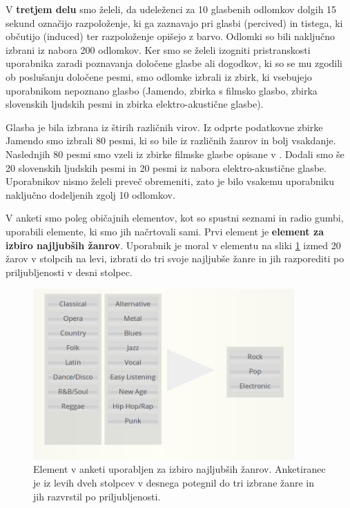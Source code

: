 \documentclass[a4paper, 12pt]{book}
\begin{document}
{V \textbf{tretjem delu} smo želeli, da udeleženci za 10 glasbenih odlomkov dolgih 15 sekund označijo razpoloženje, ki ga zaznavajo pri glasbi (percived) in tistega, ki občutijo (induced) ter razpoloženje opišejo z barvo. Odlomki so bili naključno izbrani iz nabora 200 odlomkov. Ker smo se želeli izogniti pristranskosti uporabnika zaradi poznavanja določene glasbe ali dogodkov, ki so se mu zgodili ob poslušanju določene pesmi, smo odlomke izbrali iz zbirk, ki vsebujejo uporabnikom nepoznano glasbo (Jamendo, zbirka s filmsko glasbo, zbirka slovenskih ljudskih pesmi in zbirka elektro-akustične glasbe).  

Glasba je bila izbrana iz štirih različnih virov. Iz odprte podatkovne zbirke Jamendo smo izbrali 80 pesmi, ki so bile iz različnih žanrov in bolj vsakdanje. Naslednjih 80 pesmi smo vzeli iz zbirke filmske glasbe opisane v \cite{Eerola2010}. Dodali smo še 20 slovenskih ljudskih pesmi in 20 pesmi iz nabora elektro-akustične glasbe. Uporabnikov nismo želeli preveč obremeniti, zato je bilo vsakemu uporabniku naključno dodeljenih zgolj 10 odlomkov.

V anketi smo poleg običajnih elementov, kot so spustni seznami in radio gumbi, uporabili elemente, ki smo jih načrtovali sami. Prvi element je \textbf{element za izbiro najljubših žanrov}.  Uporabnik je moral v elementu na sliki \ref{genresel} izmed 20 žarov v stolpcih na levi, izbrati do tri svoje najljubše žanre in jih razporediti po priljubljenosti v desni stolpec.

\begin{figure}[h!t]
\centering
\includegraphics[width=10cm]{genresel.png}

\caption{Element v anketi uporabljen za izbiro najljubših žanrov. Anketiranec je iz levih dveh stolpcev v desnega potegnil do tri izbrane žanre in jih razvrstil po priljubljenosti.}
\label{genresel}
\end{figure}

}
\end{document}
